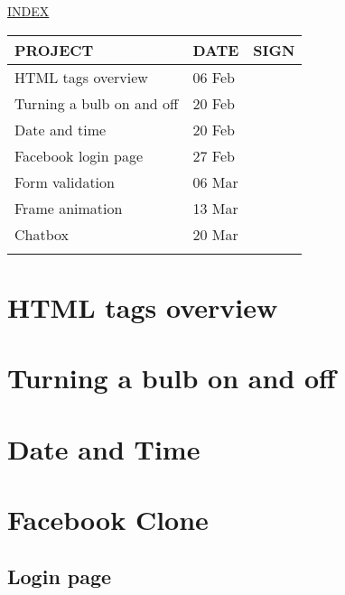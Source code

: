 \documentclass[12pt]{article}
\begin{document}

\Huge
{}
\centering \underline{INDEX} \\
\vspace*{3\baselineskip}
\setlength{\arrayrulewidth}{0.4mm}
\renewcommand{\arraystretch}{1.8}
\setlength{\tabcolsep}{10pt}

\LARGE
\begin{tabular}{|m{8.5cm}|m{2.2cm}|m{3cm}|}
\hline
PROJECT & DATE & SIGN \\
\hline
\hline
HTML tags overview & 06 Feb & \\
Turning a bulb on and off & 20 Feb & \\
Date and time & 20 Feb & \\
Facebook login page & 27 Feb & \\
Form validation & 06 Mar & \\
Frame animation & 13 Mar & \\
Chatbox & 20 Mar & \\
& & \\
\hline
\end{tabular}
\newpage
\restoregeometry
\normalsize

\section{HTML tags overview}
\texttt {}
\vspace*{6\baselineskip}

\section{Turning a bulb on and off}
\texttt {}
\newpage

\section{Date and Time}
\texttt {}

\section{Facebook Clone}
\subsection{Login page}
\texttt {}

\end{document}
